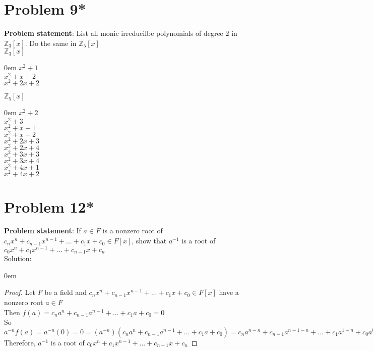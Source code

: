 \documentclass{article} %
\begin{document}
\newpage

\section*{Problem 9*}


\textbf{Problem statement}: List all monic irreducilbe polynomials of degree 2 in $\mathbb{Z}_3[x]$.  Do the same in $\mathbb{Z}_5[x]$
\\

$\mathbb{Z}_3[x]$
\begin{addmargin}[1em]{0em}
$x^2 + 1$
\\$x^2 + x + 2$
\\$x^2 + 2x + 2$
\end{addmargin}

$\mathbb{Z}_5[x]$
\begin{addmargin}[1em]{0em}
$x^2 + 2$
\\$x^2 + 3$
\\$x^2 + x + 1$
\\$x^2 + x + 2$
\\$x^2 + 2x + 3$
\\$x^2 + 2x + 4$
\\$x^2 + 3x + 3$
\\$x^2 + 3x + 4$
\\$x^2 + 4x + 1$
\\$x^2 + 4x + 2$
\end{addmargin}

\newpage

\section*{Problem 12*}


\textbf{Problem statement}: If $a \in F$ is a nonzero root of $c_nx^n + c_{n-1}x^{n-1} + ... + c_1x + c_0 \in F[x]$, show that $a^{-1}$ is a root of $c_0x^n + c_{1}x^{n-1} + ... + c_{n-1}x + c_n$
\\

Solution: 
\begin{addmargin}[1em]{0em}
\begin{proof}
Let $F$ be a field and $c_nx^n + c_{n-1}x^{n-1} + ... + c_1x + c_0 \in F[x]$ have a nonzero root $a \in F$
\\Then $f(a) = c_na^n + c_{n-1}a^{n-1} + ... + c_1a + c_0 = 0$
\\So $a^{-n}f(a) = a^{-n}(0) = 0 = (a^{-n})( c_na^n + c_{n-1}a^{n-1} + ... + c_1a + c_0) = c_na^{n-n} + c_{n-1}a^{n-1 - n} + ... + c_1a^{1-n} + c_0a^{0-n} = c_na^{0} + c_{n-1}a^{-1} + ... + c_1a^{-n + 1} + c_0a^{-n} = c_0a^{-n} + c_1a^{-n + 1} + ... + c_{n-1}a + c_n = f(a^{-1})$
\\Therefore, $a^{-1}$ is a root of $c_0x^n + c_{1}x^{n-1} + ... + c_{n-1}x + c_n$
\end{proof}
\end{addmargin}
\end{document}
